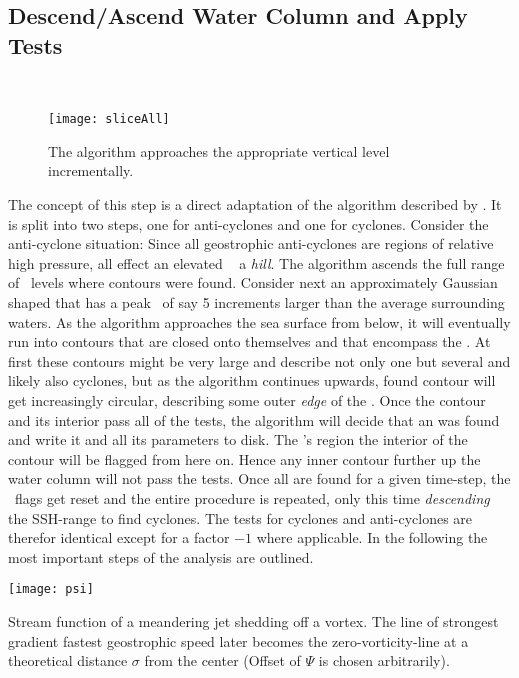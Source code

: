 \subsection{Descend/Ascend Water Column and Apply Tests}
 \\
\begin{figure}
	\texttt{[image: sliceAll]}
	\caption{The algorithm approaches the appropriate vertical level incrementally.}
	\label{fig:sliceAll}
\end{figure}
The concept of this step is a direct adaptation of the algorithm described
by \citet{Chelton2011}. It is split into two steps, one for anti-cyclones and one
for cyclones. Consider \eg the anti-cyclone situation: Since all
geostrophic anti-cyclones are regions of relative high pressure, all
\ACs effect an elevated \SSH~\ie
a \textit{hill}. The algorithm ascends the full range of \SSH~levels where
contours were found. Consider next an approximately Gaussian shaped \AC that has a
peak \SSH~of say 5 increments larger than the average surrounding waters.
As the algorithm approaches the sea surface from below, it will eventually run
into contours that are closed onto themselves and that encompass the \AC. At
first these contours might be very large and describe not only one but several
\ACs and likely also cyclones, but as the algorithm continues upwards, found
contour will get increasingly circular, describing some outer \textit{edge} of
the \AC. Once the contour and its interior pass all of the tests, the algorithm
will decide that an \AC was found and write it and all its parameters to disk.
The \AC's region \ie the interior of the contour will be flagged from here on.
Hence any inner contour further up the water column will not pass the tests.
Once all \ACs are found for a given time-step, the \SSH~flags get reset and the
entire procedure is repeated, only this time \textit{descending} the SSH-range to
find cyclones. The tests for cyclones and anti-cyclones are therefor identical except for
a factor $-1$ where applicable. In the following the most important steps of the
analysis are
outlined.
\begin{marginfigure}
	\texttt{[image: psi]}
	\caption{Stream function of a meandering jet shedding off a vortex. The line of strongest gradient \ie fastest geostrophic speed later becomes the zero-vorticity-line at a theoretical distance $\sigma$ from the center (Offset of $\Psi$ is chosen arbitrarily).}
	\label{fig:psi}
\end{marginfigure}
